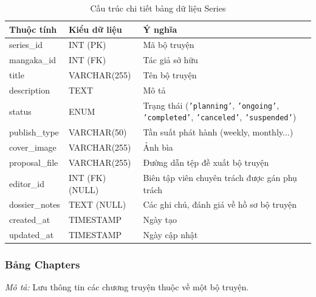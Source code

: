 \begin{table}[H]
\centering
\renewcommand{\arraystretch}{1.3}
\begin{tabularx}{\textwidth}{|p{4cm}|p{3cm}|>{\raggedright\arraybackslash}X|}
\hline
\rowcolor{tableheader}
\textbf{Thuộc tính} & \textbf{Kiểu dữ liệu} & \textbf{Ý nghĩa} \\ \hline
series\_id & INT (PK) & Mã bộ truyện \\ \hline
mangaka\_id & INT (FK) & Tác giả sở hữu \\ \hline
title & VARCHAR(255) & Tên bộ truyện \\ \hline
description & TEXT & Mô tả \\ \hline
status & ENUM & Trạng thái (\texttt{'planning'}, \texttt{'ongoing'}, \texttt{'completed'}, \texttt{'canceled'}, \texttt{'suspended'}) \\ \hline
publish\_type & VARCHAR(50) & Tần suất phát hành (weekly, monthly...) \\ \hline
cover\_image & VARCHAR(255) & Ảnh bìa \\ \hline
proposal\_file & VARCHAR(255) & Đường dẫn tệp đề xuất bộ truyện \\ \hline
editor\_id & INT (FK) (NULL) & Biên tập viên chuyên trách được gán phụ trách \\ \hline
dossier\_notes & TEXT (NULL) & Các ghi chú, đánh giá về hồ sơ bộ truyện \\ \hline
created\_at & TIMESTAMP & Ngày tạo \\ \hline
updated\_at & TIMESTAMP & Ngày cập nhật \\ \hline
\end{tabularx}
\caption{Cấu trúc chi tiết bảng dữ liệu Series}
\label{tab:db_series}
\end{table}

\subsubsection{Bảng Chapters}
\label{subsubsec:tbl_chapters}
\textit{Mô tả:} Lưu thông tin các chương truyện thuộc về một bộ truyện.

